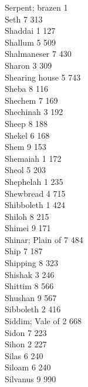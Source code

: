 Serpent; brazen \hfill 1 \\
Seth \hfill 7 \quad \phantom{0}313\\
Shaddai \hfill 1 \quad \phantom{0}127\\
Shallum \hfill 5 \quad \phantom{0}509\\
Shalmaneser \hfill 7 \quad \phantom{0}430\\
Sharon \hfill 3 \quad \phantom{0}309\\
Shearing house \hfill 5 \quad \phantom{0}743\\
Sheba \hfill 8 \quad \phantom{0}116\\
Shechem \hfill 7 \quad \phantom{0}169\\
Shechinah \hfill 3 \quad \phantom{0}192\\
Sheep \hfill 8 \quad \phantom{0}188\\
Shekel \hfill 6 \quad \phantom{0}168\\
Shem \hfill 9 \quad \phantom{0}153\\
Shemaiah \hfill 1 \quad \phantom{0}172\\
Sheol \hfill 5 \quad \phantom{0}203\\
Shephelah \hfill 1 \quad \phantom{0}235\\
Shewbread \hfill 4 \quad \phantom{0}715\\
Shibboleth \hfill 1 \quad \phantom{0}424\\
Shiloh \hfill 8 \quad \phantom{0}215\\
Shimei \hfill 9 \quad \phantom{0}171\\
Shinar; Plain of \hfill 7 \quad \phantom{0}484\\
Ship \hfill 7 \quad \phantom{0}187\\
Shipping \hfill 8 \quad \phantom{0}323\\
Shishak \hfill 3 \quad \phantom{0}246\\
Shittim \hfill 8 \quad \phantom{0}566\\
Shushan \hfill 9 \quad \phantom{0}567\\
Sibboleth \hfill 2 \quad \phantom{0}416\\
Siddim; Vale of \hfill 2 \quad \phantom{0}668\\
Sidon \hfill 7 \quad \phantom{0}223\\
Sihon \hfill 2 \quad \phantom{0}227\\
Silas \hfill 6 \quad \phantom{0}240\\
Siloam \hfill 6 \quad \phantom{0}240\\
Silvanus \hfill 9 \quad \phantom{0}990\\
